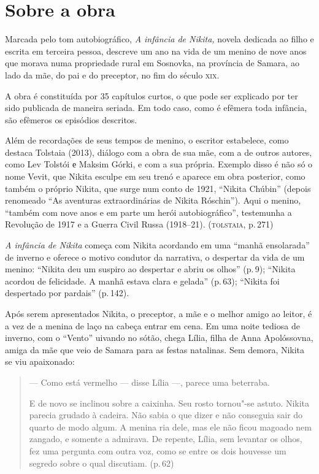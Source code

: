 \section{Sobre a obra}\label{para2}

\noindent{}Marcada pelo tom autobiográfico, \emph{A infância de Nikita,} novela
dedicada ao filho e escrita em terceira pessoa, descreve um ano na vida
de um menino de nove anos que morava numa propriedade rural em Sosnovka,
na província de Samara, ao lado da mãe, do pai e do preceptor, no fim do
século \textsc{xix}.

A obra é constituída por 35 capítulos curtos, o que pode ser explicado
por ter sido publicada de maneira seriada. Em todo caso, como é efêmera
toda infância, são efêmeros os episódios descritos.

Além de recordações de seus tempos de menino, o escritor estabelece,
como destaca Tolstaia (2013), diálogo com a obra de sua mãe, com a de
outros autores, como Lev Tolstói е Maksim Górki, e com a sua própria.
Exemplo disso é não só o nome Vevit, que Nikita esculpe em seu trenó e
aparece em obra posterior, como também o próprio Nikita, que surge num
conto de 1921, ``Nikita Chúbin'' (depois renomeado ``As aventuras
extraordinárias de Nikita Róschin''). Aqui o menino, ``também com nove
anos e em parte um herói autobiográfico'', testemunha a Revolução de
1917 e a Guerra Civil Russa (1918--21). (\textsc{tolstaia}, p.\,271)

\asterisc

\emph{A infância de Nikita} começa com Nikita acordando em uma ``manhã
ensolarada'' de inverno e oferece o motivo condutor da narrativa, o
despertar da vida de um menino: ``Nikita deu um suspiro ao despertar e
abriu os olhos'' (p.\,9); ``Nikita acordou de felicidade. A manhã estava
clara e gelada'' (p.\,63); ``Nikita foi despertado por pardais'' (p.\,142).

Após serem apresentados Nikita, o preceptor, a mãe e o melhor amigo ao
leitor, é a vez de a menina de laço na cabeça entrar em cena. Em uma
noite tediosa de inverno, com o ``Vento'' uivando no sótão, chega Lília,
filha de Anna Apolóssovna, amiga da mãe que veio de Samara para as
festas natalinas. Sem demora, Nikita se viu apaixonado:

\begin{quote}
--- Como está vermelho --- disse Lília ---, parece uma beterraba.

E de novo se inclinou sobre a caixinha. Seu rosto tornou"-se astuto.
Nikita parecia grudado à cadeira. Não sabia o que dizer e não conseguia
sair do quarto de modo algum. A menina ria dele, mas ele não ficou
magoado nem zangado, e somente a admirava. De repente, Lília, sem
levantar os olhos, fez uma pergunta com outra voz, como se entre os dois
houvesse um segredo sobre o qual discutiam. (p.\,62)
\end{quote}

